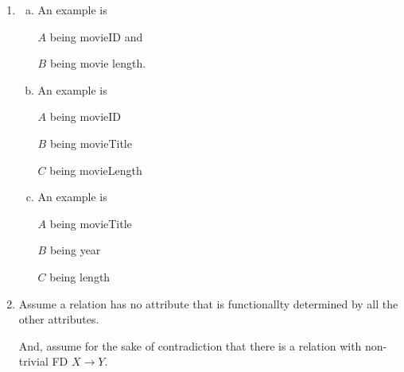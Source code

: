 \documentclass[12pt]{article}
\begin{document}
\begin{enumerate}[1.]
\begin{enumerate}[a)]




        \end{enumerate}

        \item

        \begin{enumerate}[a)]
            \item

            An example is

            \bigskip

            $A$ being movieID and

            $B$ being movie length.

            \item

            An example is

            \bigskip

            $A$ being movieID

            $B$ being movieTitle

            $C$ being movieLength

            \item

            An example is

            \bigskip

            $A$ being movieTitle

            $B$ being year

            $C$ being length
        \end{enumerate}

        \item

        \bigskip

        Assume a relation has no attribute that is functionallty determined
        by all the other attributes.

        \bigskip

        And, assume for the sake of contradiction that there is a relation with
        non-trivial FD $X \to Y$.


\end{enumerate}
\end{document}
